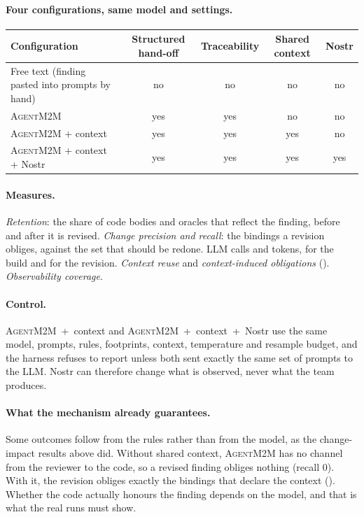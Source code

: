 \documentclass[10pt,a4paper]{article}
\newcommand{\tool}{\textsc{AgentM2M}}
\theoremstyle{definition}
\begin{document}
\paragraph{Four configurations, same model and settings.}
\begin{center}\small
\begin{tabular}{@{}l c c c c@{}}
\toprule
Configuration & Structured hand-off & Traceability & Shared context & Nostr \\
\midrule
Free text (finding pasted into prompts by hand) & no & no & no & no \\
\tool{} & yes & yes & no & no \\
\tool{} + context & yes & yes & yes & no \\
\tool{} + context + Nostr & yes & yes & yes & yes \\
\bottomrule
\end{tabular}
\end{center}

\paragraph{Measures.} \emph{Retention}: the share of code bodies and oracles
that reflect the finding, before and after it is revised.
\emph{Change precision and recall}: the bindings a revision obliges, against
the set that should be redone. LLM calls and tokens, for the build and for the
revision. \emph{Context reuse} and \emph{context-induced obligations}
(). \emph{Observability coverage}.

\paragraph{Control.} \tool{}~+~context and \tool{}~+~context~+~Nostr use the
same model, prompts, rules, footprints, context, temperature and resample
budget, and the harness refuses to report unless both sent exactly the same
set of prompts to the LLM. Nostr can therefore change what is observed, never
what the team produces.

\paragraph{What the mechanism already guarantees.} Some outcomes follow from
the rules rather than from the model, as the change-impact results above did.
Without shared context, \tool{} has no channel from the reviewer to the code,
so a revised finding obliges nothing (recall 0). With it, the revision
obliges exactly the bindings that declare the context ().
Whether the code actually honours the finding depends on the model, and that
is what the real runs must show.
\end{document}
